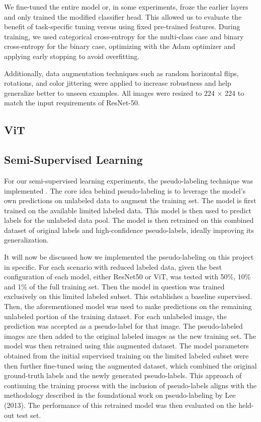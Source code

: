 \documentclass{article}
\begin{document}
We fine-tuned the entire model or, in some experiments, froze the earlier layers and only trained the modified classifier head. This allowed us to evaluate the benefit of task-specific tuning versus using fixed pre-trained features. During training, we used categorical cross-entropy for the multi-class case and binary cross-entropy for the binary case, optimizing with the Adam optimizer and applying early stopping to avoid overfitting.

Additionally, data augmentation techniques such as random horizontal flips, rotations, and color jittering were applied to increase robustness and help generalize better to unseen examples. All images were resized to 224 × 224 to match the input requirements of ResNet-50.

\subsection{ViT}


\subsection{Semi-Supervised Learning}
For our semi-supervised learning experiments, the pseudo-labeling technique was implemented \cite{lee2013pseudo}. The core idea behind  pseudo-labeling is to leverage the model's own predictions on unlabeled data to augment the training set. The model is first trained on the available limited labeled data. This model is then used to predict labels for the unlabeled data pool. The model is then retrained on this combined dataset of original labels and high-confidence pseudo-labels, ideally improving its generalization. 

It will now be discussed how we implemented the pseudo-labeling on this project in specific. For each scenario with reduced labeled data, given the best configuration of each model, either ResNet50 or ViT, was tested with 50\%, 10\% and 1\% of the full training set. Then the model in question was trained exclusively on this limited labeled subset. This establishes a baseline supervised. Then, the aforementioned model was used to make predictions on the remaining unlabeled portion of the training dataset. For each unlabeled image, the prediction was accepted as a pseudo-label for that image. The pseudo-labeled images are then added to the original labeled images as the new training set. The model was then retrained using this augmented dataset. The model parameters obtained from the initial supervised training on the limited labeled subset were then further fine-tuned using the augmented dataset, which combined the original ground-truth labels and the newly generated pseudo-labels. This approach of continuing the training process with the inclusion of pseudo-labels aligns with the methodology described in the foundational work on pseudo-labeling by Lee (2013)\cite{lee2013pseudo}. The performance of this retrained model was then evaluated on the held-out test set.  
\end{document}
